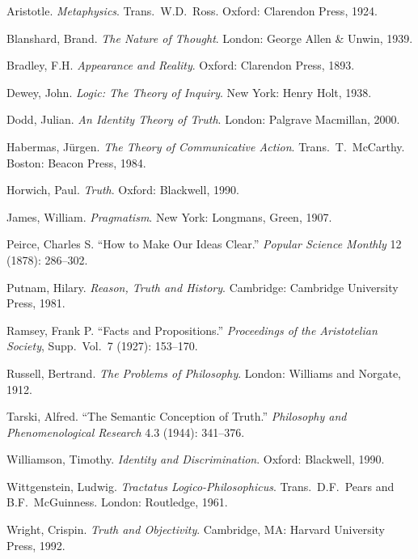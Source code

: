 \documentclass[11pt, oneside]{article}
\begin{document}
\begin{description}[leftmargin=1.4em, labelindent=0pt, itemsep=4pt,
                    parsep=0pt, font=\normalfont]

\item Aristotle. \textit{Metaphysics}. Trans.\ W.D.\ Ross.
      Oxford: Clarendon Press, 1924.

\item Blanshard, Brand. \textit{The Nature of Thought}.
      London: George Allen \& Unwin, 1939.

\item Bradley, F.H. \textit{Appearance and Reality}.
      Oxford: Clarendon Press, 1893.

\item Dewey, John. \textit{Logic: The Theory of Inquiry}.
      New York: Henry Holt, 1938.

\item Dodd, Julian. \textit{An Identity Theory of Truth}.
      London: Palgrave Macmillan, 2000.

\item Habermas, J\"urgen. \textit{The Theory of Communicative Action}.
      Trans.\ T.\ McCarthy. Boston: Beacon Press, 1984.

\item Horwich, Paul. \textit{Truth}. Oxford: Blackwell, 1990.

\item James, William. \textit{Pragmatism}.
      New York: Longmans, Green, 1907.

\item Peirce, Charles S\@. ``How to Make Our Ideas Clear.''
      \textit{Popular Science Monthly} 12 (1878): 286--302.

\item Putnam, Hilary. \textit{Reason, Truth and History}.
      Cambridge: Cambridge University Press, 1981.

\item Ramsey, Frank P\@. ``Facts and Propositions.''
      \textit{Proceedings of the Aristotelian Society},
      Supp.\ Vol.\ 7 (1927): 153--170.

\item Russell, Bertrand. \textit{The Problems of Philosophy}.
      London: Williams and Norgate, 1912.

\item Tarski, Alfred. ``The Semantic Conception of Truth.''
      \textit{Philosophy and Phenomenological Research}
      4.3 (1944): 341--376.

\item Williamson, Timothy. \textit{Identity and Discrimination}.
      Oxford: Blackwell, 1990.

\item Wittgenstein, Ludwig. \textit{Tractatus Logico-Philosophicus}.
      Trans.\ D.F.\ Pears and B.F.\ McGuinness.
      London: Routledge, 1961.

\item Wright, Crispin. \textit{Truth and Objectivity}.
      Cambridge, MA: Harvard University Press, 1992.

\end{description}

\end{document}
